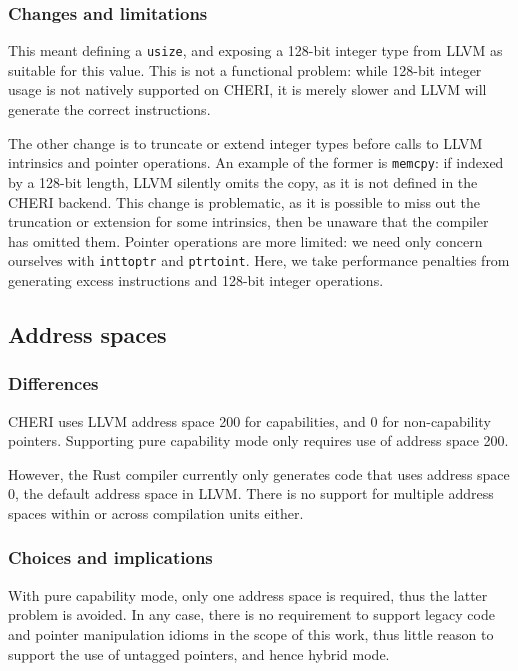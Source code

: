 \documentclass[dissertation.tex]{subfiles}
\begin{document}
\subsubsection{Changes and limitations}
This meant defining a \texttt{usize}, and exposing a 128-bit integer
type from LLVM as suitable for this value.
This is not a functional problem: while 128-bit integer usage is not
natively supported on CHERI, it is merely slower and LLVM will generate
the correct instructions.

The other change is to truncate or extend integer types before calls to
LLVM intrinsics and pointer operations.
An example of the former is \texttt{memcpy}: if indexed by a 128-bit
length, LLVM silently omits the copy, as it is not defined in the
CHERI backend.
This change is problematic, as it is possible to miss out the truncation
or extension for some intrinsics, then be unaware that the compiler has
omitted them.
Pointer operations are more limited: we need only concern ourselves with
\texttt{inttoptr} and \texttt{ptrtoint}.
Here, we take performance penalties from generating excess instructions
and 128-bit integer operations.


\subsection{Address spaces}
\label{sec:impl-addrspace}

\subsubsection{Differences}
CHERI uses LLVM address space 200 for capabilities, and 0 for
non-capability pointers.
Supporting pure capability mode only requires use of address space 200.

However, the Rust compiler currently only generates code that uses
address space 0, the default address space in LLVM.
There is no support for multiple address spaces within or across
compilation units either.

\subsubsection{Choices and implications}
With pure capability mode, only one address space is required, thus the
latter problem is avoided.
In any case, there is no requirement to support legacy code and pointer
manipulation idioms in the scope of this work, thus little reason to
support the use of untagged pointers, and hence hybrid mode.
\end{document}
